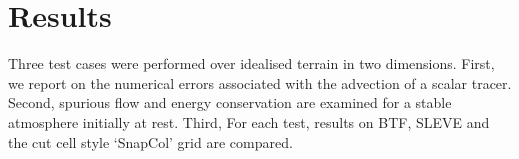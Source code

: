 \chapter{Results}
Three test cases were performed over idealised terrain in two dimensions.  First, we report on the numerical errors associated with the advection of a scalar tracer.  Second, spurious flow and energy conservation are examined for a stable atmosphere initially at rest.  Third,   For each test, results on BTF, SLEVE and the cut cell style `SnapCol' grid are compared.  




